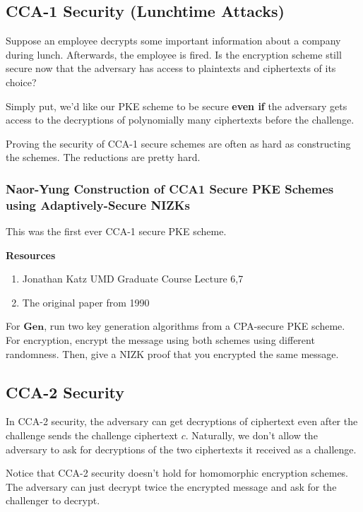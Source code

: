\documentclass{article}
\theoremstyle{definition}
\newcommand{\Gen}{\textbf{Gen}}
\begin{document}
\subsection{CCA-1 Security (Lunchtime Attacks)}

Suppose an employee decrypts some important information about a company
during lunch. Afterwards, the employee is fired. Is the encryption scheme
still secure now that the adversary has access to plaintexts and ciphertexts
of its choice?

Simply put, we'd like our PKE scheme to be secure \textbf{even if}
the adversary gets access to the decryptions of polynomially many ciphertexts 
before the challenge.

Proving the security of CCA-1 secure schemes are often as hard as constructing
the schemes. The reductions are pretty hard.

\subsubsection{Naor-Yung Construction of CCA1 Secure PKE Schemes using Adaptively-Secure NIZKs}

This was the first ever CCA-1 secure PKE scheme.

\textbf{Resources}
\begin{enumerate}
    \item Jonathan Katz UMD Graduate Course Lecture 6,7
    \item The original paper from 1990
\end{enumerate}

For $\Gen$, run two key generation algorithms from a CPA-secure PKE scheme.
For encryption, encrypt the message using both schemes using different randomness.
Then, give a NIZK proof that you encrypted the same message.


\subsection{CCA-2 Security}

In CCA-2 security, the adversary can get decryptions of ciphertext even after
the challenge sends the challenge ciphertext $c$. Naturally, we don't allow the adversary
to ask for decryptions of the two ciphertexts it received as a challenge.

Notice that CCA-2 security doesn't hold for homomorphic encryption schemes. The adversary
can just decrypt twice the encrypted message and ask for the challenger to decrypt.
\end{document}
